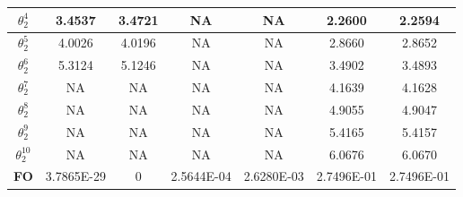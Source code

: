 \begin{table}
{\begin{tabular}{|c|c|c|c|c|c|c|}
		\hline
		$\theta^4_2$                     & 3.4537&3.4721     & NA & NA       & 2.2600 & 2.2594    \\
		\hline
		$\theta^5_2$                     & 4.0026&4.0196    & NA & NA       & 2.8660  &  2.8652  \\
		\hline
		$\theta^6_2$                     & 5.3124&5.1246     & NA &NA        & 3.4902 &  3.4893   \\
		\hline
		$\theta^7_2$                     & NA    &  NA   & NA & NA       & 4.1639 & 4.1628    \\
		\hline
		$\theta^8_2$                     & NA    &  NA   & NA & NA       & 4.9055 &  4.9047   \\
		\hline
		$\theta^9_2$                     & NA    &   NA  & NA & NA       & 5.4165 & 5.4157    \\
		\hline
		$\theta^{10}_2$                     & NA &     NA   & NA &NA        & 6.0676 & 6.0670    \\
		\hline
		\textbf{FO}                    & 3.7865E-29 &0&2.5644E-04&2.6280E-03& 2.7496E-01& 2.7496E-01\\
		\hline
	\end{tabular}
}
\end{table}

